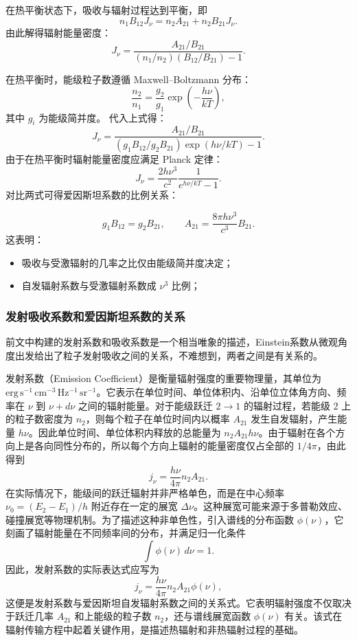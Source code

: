 在热平衡状态下，吸收与辐射过程达到平衡，即
\[
n_1 B_{12} J_\nu = n_2 A_{21} + n_2 B_{21} J_\nu.
\]
由此解得辐射能量密度：
\[
J_\nu = \frac{A_{21}/B_{21}}{(n_1/n_2)(B_{12}/B_{21}) - 1}.
\]


在热平衡时，能级粒子数遵循 Maxwell–Boltzmann 分布：
\[
\frac{n_2}{n_1} = \frac{g_2}{g_1} \exp\!\left(-\frac{h\nu}{kT}\right),
\]
其中 $g_i$ 为能级简并度。  
代入上式得：
\[
J_\nu = 
\frac{A_{21}/B_{21}}
{(g_1 B_{12}/g_2 B_{21}) \exp(h\nu/kT) - 1}.
\]
由于在热平衡时辐射能量密度应满足 Planck 定律：
\[
J_\nu = \frac{2h\nu^3}{c^2} \frac{1}{e^{h\nu/kT} - 1}.
\]
对比两式可得爱因斯坦系数的比例关系：

\[
\boxed{
g_1 B_{12} = g_2 B_{21}, \qquad 
A_{21} = \frac{8\pi h\nu^3}{c^3} B_{21}.
}
\]
这表明：
\begin{itemize}
  \item 吸收与受激辐射的几率之比仅由能级简并度决定；
  \item 自发辐射系数与受激辐射系数成 $\nu^3$ 比例；
\end{itemize}

\subsubsection{发射吸收系数和爱因斯坦系数的关系}
前文中构建的发射系数和吸收系数是一个相当唯象的描述，Einstein系数从微观角度出发给出了粒子发射吸收之间的关系，不难想到，两者之间是有关系的。


发射系数（Emission Coefficient）是衡量辐射强度的重要物理量，其单位为 $\mathrm{erg\,s^{-1}\,cm^{-3}\,Hz^{-1}\,sr^{-1}}$。它表示在单位时间、单位体积内、沿单位立体角方向、频率在 $\nu$ 到 $\nu + d\nu$ 之间的辐射能量。对于能级跃迁 $2 \to 1$ 的辐射过程，若能级 2 上的粒子数密度为 $n_2$，则每个粒子在单位时间内以概率 $A_{21}$ 发生自发辐射，产生能量 $h\nu$。因此单位时间、单位体积内释放的总能量为 $n_2 A_{21} h\nu$。由于辐射在各个方向上是各向同性分布的，所以每个方向上辐射的能量密度仅占全部的 $1/4\pi$，由此得到
\[
j_\nu = \frac{h\nu}{4\pi} n_2 A_{21}.
\]
在实际情况下，能级间的跃迁辐射并非严格单色，而是在中心频率 $\nu_0 = (E_2 - E_1)/h$ 附近存在一定的展宽 $\Delta \nu$。这种展宽可能来源于多普勒效应、碰撞展宽等物理机制。为了描述这种非单色性，引入谱线的分布函数 $\phi(\nu)$，它刻画了辐射能量在不同频率间的分布，并满足归一化条件
\[
\int \phi(\nu)\, d\nu = 1.
\]
因此，发射系数的实际表达式应写为
\[
j_\nu = \frac{h\nu}{4\pi} n_2 A_{21} \phi(\nu),
\]
这便是发射系数与爱因斯坦自发辐射系数之间的关系式。它表明辐射强度不仅取决于跃迁几率 $A_{21}$ 和上能级的粒子数 $n_2$，还与谱线展宽函数 $\phi(\nu)$ 有关。该式在辐射传输方程中起着关键作用，是描述热辐射和非热辐射过程的基础。


